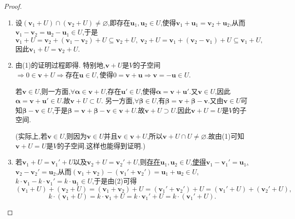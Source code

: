 \documentclass[../../main.tex]{subfiles}%
\begin{document}
\begin{proof}
\begin{enumerate}[(1)]
\item 设\((\boldsymbol{v}_1 + U)\cap(\boldsymbol{v}_2 + U)\neq\varnothing\),即存在\(\boldsymbol{u}_1,\boldsymbol{u}_2\in U\),使得\(\boldsymbol{v}_1+\boldsymbol{u}_1=\boldsymbol{v}_2+\boldsymbol{u}_2\),从而\(\boldsymbol{v}_1-\boldsymbol{v}_2=\boldsymbol{u}_2-\boldsymbol{u}_1\in U\),于是
\[
\boldsymbol{v}_1 + U=\boldsymbol{v}_2+(\boldsymbol{v}_1 - \boldsymbol{v}_2)+U\subseteq\boldsymbol{v}_2 + U,\ \boldsymbol{v}_2 + U=\boldsymbol{v}_1+(\boldsymbol{v}_2 - \boldsymbol{v}_1)+U\subseteq\boldsymbol{v}_1 + U,
\]
因此\(\boldsymbol{v}_1 + U=\boldsymbol{v}_2 + U\).
\item 由(1)的证明过程即得. 特别地,\(\boldsymbol{v}+U\)是\(V\)的子空间\(\Rightarrow0\in \boldsymbol{v}+U\Rightarrow \text{存在}\boldsymbol{u}\in U,\text{使得}0=\boldsymbol{v}+\boldsymbol{u}\Rightarrow \boldsymbol{v}=-\boldsymbol{u}\in U \).

若$\boldsymbol{v}\in U$,则一方面,$\forall \boldsymbol{\alpha }\in \boldsymbol{v}+U$,存在$\boldsymbol{u}'\in U$,使得$\boldsymbol{\alpha }=\boldsymbol{v}+\boldsymbol{u}'$.又$\boldsymbol{v}\in U$,因此$\boldsymbol{\alpha }=\boldsymbol{v}+\boldsymbol{u}'\in U$.故$\boldsymbol{v}+U\subset U$.
另一方面,$\forall \boldsymbol{\beta }\in U$,有$\boldsymbol{\beta }=\boldsymbol{v}+\boldsymbol{\beta }-\boldsymbol{v}$.又由$\boldsymbol{v}\in U$可知$\boldsymbol{\beta }-\boldsymbol{v}\in U$,于是$\boldsymbol{\beta }=\boldsymbol{v}+\boldsymbol{\beta }-\boldsymbol{v}\in \boldsymbol{v}+U$.故$\boldsymbol{v}+U\supset U$.因此$\boldsymbol{v}+U = U$是\(V\)的子空间.

(实际上,若$\boldsymbol{v}\in U$,则因为$\boldsymbol{v}\in U\text{并且}\boldsymbol{v}\in \boldsymbol{v}+U$,所以$\boldsymbol{v}+U\cap U\ne \varnothing$.故由(1)可知$\boldsymbol{v}+U=U$是\(V\)的子空间.这样也能得到证明.)

\item 若\(\boldsymbol{v}_1 + U=\boldsymbol{v}_1'+U\)以及\(\boldsymbol{v}_2 + U=\boldsymbol{v}_2'+U\),则\hyperlink{remark1陪集}{存在\(\boldsymbol{u}_1,\boldsymbol{u}_2\in U\),使得\(\boldsymbol{v}_1-\boldsymbol{v}_1'=\boldsymbol{u}_1\),\(\boldsymbol{v}_2-\boldsymbol{v}_2'=\boldsymbol{u}_2\)},从而\((\boldsymbol{v}_1+\boldsymbol{v}_2)-(\boldsymbol{v}_1'+\boldsymbol{v}_2')=\boldsymbol{u}_1+\boldsymbol{u}_2\in U\),\(k\cdot\boldsymbol{v}_1 - k\cdot\boldsymbol{v}_1'=k\cdot\boldsymbol{u}_1\in U\),于是由(2)可得
\[
(\boldsymbol{v}_1 + U)+(\boldsymbol{v}_2 + U)=(\boldsymbol{v}_1+\boldsymbol{v}_2)+U=(\boldsymbol{v}_1'+\boldsymbol{v}_2')+U=(\boldsymbol{v}_1'+U)+(\boldsymbol{v}_2'+U),
\]
\[
k\cdot(\boldsymbol{v}_1 + U)=k\cdot\boldsymbol{v}_1+U=k\cdot\boldsymbol{v}_1'+U=k\cdot(\boldsymbol{v}_1'+U).
\]
\end{enumerate}
\end{proof}
\end{document}
